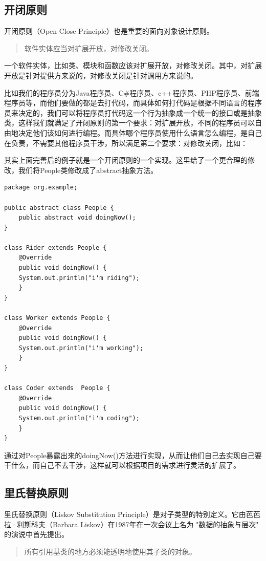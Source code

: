\documentclass[11pt]{article}
\begin{document}
\subsection{开闭原则}
\label{sec:org8655d01}
开闭原则（Open Close Principle）也是重要的面向对象设计原则。

\begin{quote}
软件实体应当对扩展开放，对修改关闭。
\end{quote}

一个软件实体，比如类、模块和函数应该对扩展开放，对修改关闭。其中，对扩展开放是针对提供方来说的，对修改关闭是针对调用方来说的。

比如我们的程序员分为Java程序员、C\#程序员、c++程序员、PHP程序员、前端程序员等，而他们要做的都是去打代码，而具体如何打代码是根据不同语言的程序员来决定的，我们可以将程序员打代码这一个行为抽象成一个统一的接口或是抽象类，这样我们就满足了开闭原则的第一个要求：对扩展开放，不同的程序员可以自由地决定他们该如何进行编程。而具体哪个程序员使用什么语言怎么编程，是自己在负责，不需要其他程序员干涉，所以满足第二个要求：对修改关闭，比如：

其实上面完善后的例子就是一个开闭原则的一个实现。这里给了一个更合理的修改，我们将People类修改成了abstract抽象方法。
\begin{verbatim}
package org.example;

public abstract class People {
    public abstract void doingNow();
}

class Rider extends People {
    @Override
    public void doingNow() {
	System.out.println("i'm riding");
    }
}

class Worker extends People {
    @Override
    public void doingNow() {
	System.out.println("i'm working");
    }
}

class Coder extends  People {
    @Override
    public void doingNow() {
	System.out.println("i'm coding");
    }
}
\end{verbatim}
通过对People暴露出来的doingNow()方法进行实现，从而让他们自己去实现自己要干什么，而自己不去干涉，这样就可以根据项目的需求进行灵活的扩展了。

\subsection{里氏替换原则}
\label{sec:org909c6fa}
里氏替换原则（Liskov Substitution Principle）是对子类型的特别定义。它由芭芭拉·利斯科夫（Barbara Liskov）在1987年在一次会议上名为 "数据的抽象与层次" 的演说中首先提出。

\begin{quote}
所有引用基类的地方必须能透明地使用其子类的对象。
\end{quote}
\end{document}
